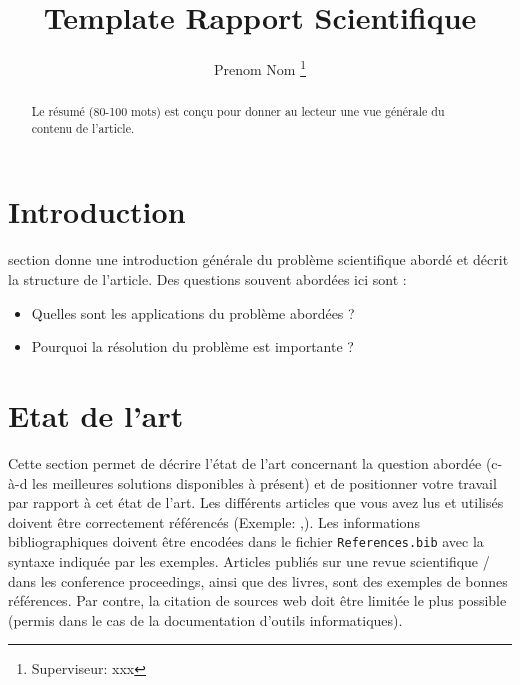 \documentclass[journal, a4paper]{IEEEtran}
\begin{document}
	\title{Template Rapport Scientifique}
	\author{Prenom Nom
	\thanks{Superviseur: xxx}}
	\maketitle

\begin{abstract}
	Le résumé (80-100 mots) est conçu pour donner au lecteur une vue générale du contenu de l'article. 
\end{abstract}

\section{Introduction}
	 section donne une introduction générale du problème scientifique abordé et décrit la structure de l'article. Des questions souvent abordées ici sont :
	\begin{itemize}
	\item Quelles sont les applications du problème abordées ?
	\item Pourquoi la résolution du problème est importante ?
	\end{itemize}	  

\section{Etat de l'art}
	Cette section permet de décrire l'état de l'art concernant la question abordée (c-à-d les meilleures solutions disponibles à présent) et de positionner votre travail par rapport à cet état de l'art.
	Les différents articles que vous avez lus et utilisés doivent être correctement référencés (Exemple: \cite{small},\cite{big}).
	Les informations bibliographiques doivent être encodées dans le fichier \texttt{References.bib} avec la syntaxe indiquée par les exemples.
	Articles publiés sur une revue scientifique / dans les conference proceedings, ainsi que des livres, sont des exemples de bonnes références.
	Par contre, la citation de sources web doit être limitée le plus possible (permis dans le cas de la documentation d'outils informatiques).
\end{document}
